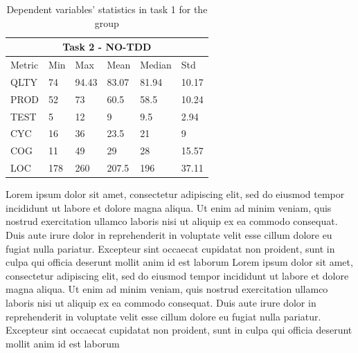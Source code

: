 \begin{table}[!h]
    \begin{center} 
        \begin{tabular}{ |p{2cm}||p{1.6cm}|p{1.6cm}|p{1.6cm}|p{1.6cm}|p{1.6cm}|}
            \hline
                \multicolumn{6}{|c|}{Task 2 - NO-TDD} \\
            \hline
                Metric & Min & Max & Mean & Median & Std\\
            \hline
                QLTY & 74 & 94.43 & 83.07 & 81.94 & 10.17 \\
                PROD & 52 & 73 & 60.5 & 58.5 & 10.24 \\
                TEST & 5 & 12 & 9 & 9.5 & 2.94 \\
                CYC & 16 & 36 & 23.5 & 21 & 9 \\
                COG & 11 & 49 & 29 & 28 & 15.57 \\
                LOC & 178 & 260 & 207.5 & 196 & 37.11 \\
            \hline
        \end{tabular}
        \caption{\label{tab_dv_t2_notdd}Dependent variables' statistics in task 1 for the \notdd group}
    \end{center}
\end{table}

Lorem ipsum dolor sit amet, consectetur adipiscing elit, sed do eiusmod tempor incididunt ut labore et dolore magna aliqua. Ut enim ad minim veniam, quis nostrud exercitation ullamco laboris nisi ut aliquip ex ea commodo consequat. Duis aute irure dolor in reprehenderit in voluptate velit esse cillum dolore eu fugiat nulla pariatur. Excepteur sint occaecat cupidatat non proident, sunt in culpa qui officia deserunt mollit anim id est laborum
Lorem ipsum dolor sit amet, consectetur adipiscing elit, sed do eiusmod tempor incididunt ut labore et dolore magna aliqua. Ut enim ad minim veniam, quis nostrud exercitation ullamco laboris nisi ut aliquip ex ea commodo consequat. Duis aute irure dolor in reprehenderit in voluptate velit esse cillum dolore eu fugiat nulla pariatur. Excepteur sint occaecat cupidatat non proident, sunt in culpa qui officia deserunt mollit anim id est laborum

